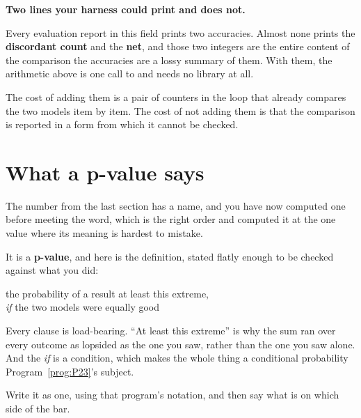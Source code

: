 \begin{fr}
\begin{aibox}
\textbf{Two lines your harness could print and does not.}

Every evaluation report in this field prints two accuracies. Almost none
prints the \textbf{discordant count} and the \textbf{net}, and those two
integers are the entire content of the comparison \dash{} the accuracies are
a lossy summary of them. With them, the arithmetic above is one call to
 and needs no library at all.

The cost of adding them is a pair of counters in the loop that already
compares the two models item by item. The cost of not adding them is that
the comparison is reported in a form from which it cannot be checked.
\end{aibox}
\end{fr}

\section{What a p-value says}
\label{sec:P27-p-value}

\begin{fr}
The number from the last section has a name, and you have now computed one
before meeting the word, which is the right order \dash{} and computed it at
the one value where its meaning is hardest to mistake.

It is a \textbf{p-value}, and here is the definition, stated flatly enough to
be checked against what you did:

\begin{center}
the probability of a result at least this extreme,\\
\emph{if} the two models were equally good
\end{center}

Every clause is load-bearing. \enquote{At least this extreme} is why the sum
ran over every outcome as lopsided as the one you saw, rather than the one
you saw alone. And the \emph{if} is a condition, which makes the whole thing
a conditional probability \dash{} Program~\ref{prog:P23}'s subject.

Write it as one, using that program's notation, and then say what is on which
side of the bar.
\dotline
\nextframe
\end{fr}

